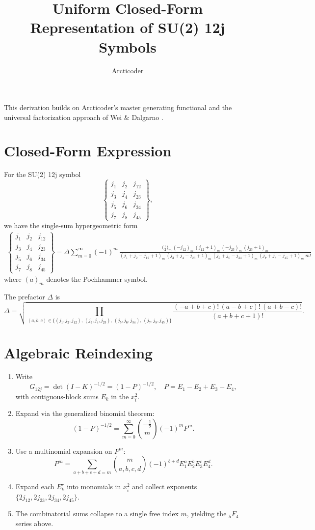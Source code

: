 \documentclass{article}
\title{Uniform Closed-Form Representation of SU(2) 12j Symbols}
\author{Arcticoder}
\date{}
\begin{document}
\maketitle

This derivation builds on 
Arcticoder’s master generating functional \cite{Arcticoder2025}
and the universal factorization approach of Wei \& Dalgarno \cite{WeiDalgarno2003}.

\section*{Closed-Form Expression}

For the SU(2) 12j symbol
\[
\begin{Bmatrix}
j_1 & j_2 & j_{12}\\
j_3 & j_4 & j_{23}\\
j_5 & j_6 & j_{34}\\
j_7 & j_8 & j_{45}
\end{Bmatrix},
\]
we have the single‐sum hypergeometric form
\[
\boxed{
\begin{aligned}
\begin{Bmatrix}
j_1 & j_2 & j_{12}\\
j_3 & j_4 & j_{23}\\
j_5 & j_6 & j_{34}\\
j_7 & j_8 & j_{45}
\end{Bmatrix}
= \Delta
\sum_{m=0}^{\infty} (-1)^m \,
\frac{\bigl(\tfrac12\bigr)_m\,(-j_{12})_m\,(j_{12}+1)_m\,(-j_{23})_m\,(j_{23}+1)_m}
{(j_1+j_2 - j_{12} +1)_m\,(j_3+j_4 - j_{23} +1)_m\,(j_5+j_6 - j_{34} +1)_m\,(j_7+j_8 - j_{45} +1)_m \; m!}
\end{aligned}
}
\]
where \((a)_m\) denotes the Pochhammer symbol.

The prefactor \(\Delta\) is
\[
\Delta = \sqrt{
\prod_{(a,b,c)\in
\{(j_1,j_2,j_{12}),\,(j_3,j_4,j_{23}),\,(j_5,j_6,j_{34}),\,(j_7,j_8,j_{45})\}}
\frac{(-a+b+c)!\,(a-b+c)!\,(a+b-c)!}{(a+b+c+1)!}
}.
\]

\section*{Algebraic Reindexing}

\begin{enumerate}
  \item Write 
  \[
    G_{12j} = \det(I-K)^{-1/2}
    = (1 - P)^{-1/2},\quad
    P = E_1 - E_2 + E_3 - E_4,
  \]
  with contiguous‐block sums \(E_k\) in the \(x_i^2\).
  \item Expand via the generalized binomial theorem:
  \[
    (1-P)^{-1/2}
    = \sum_{m=0}^\infty \binom{-\tfrac12}{m}(-1)^m P^m.
  \]
  \item Use a multinomial expansion on \(P^m\):
  \[
    P^m = \sum_{a+b+c+d=m}
    \binom{m}{a,b,c,d}(-1)^{b+d}
    E_1^a E_2^b E_3^c E_4^d.
  \]
  \item Expand each \(E_k^r\) into monomials in \(x_i^{2}\) and collect exponents \(\{2j_{12},2j_{23},2j_{34},2j_{45}\}\).
  \item The combinatorial sums collapse to a single free index \(m\), yielding the \({}_5F_4\) series above.
\end{enumerate}
\end{document}
